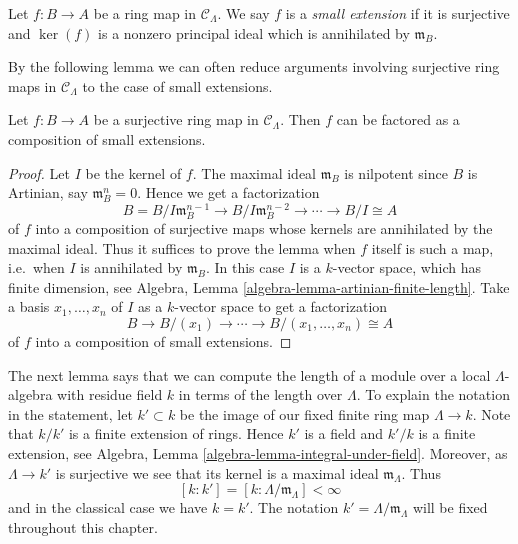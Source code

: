 \begin{definition}
\label{definition-small-extension}
Let $f: B \to A$ be a ring map in $\mathcal{C}_\Lambda$.  We say $f$
is a {\it small extension} if it is surjective and $\ker(f)$ is a nonzero
principal ideal which is annihilated by $\mathfrak{m}_B$.
\end{definition}

\noindent
By the following lemma we can often reduce arguments involving surjective ring
maps in $\mathcal{C}_\Lambda$ to the case of small extensions.

\begin{lemma}
\label{lemma-factor-small-extension}
Let $f: B \to A$ be a surjective ring map in $\mathcal{C}_\Lambda$.
Then $f$ can be factored as a composition of small extensions.
\end{lemma}

\begin{proof}
Let $I$ be the kernel of $f$.  The maximal ideal $\mathfrak{m}_B$ is
nilpotent since $B$ is Artinian, say $\mathfrak{m}_B^n = 0$. Hence we get a
factorization
$$
B = B/I\mathfrak{m}_B^{n-1} \to B/I\mathfrak{m}_B^{n-2} \to
\cdots \to B/I \cong A
$$
of $f$ into a composition of surjective maps whose kernels are annihilated by
the maximal ideal.  Thus it suffices to prove the lemma when $f$ itself is such
a map, i.e.\ when $I$ is annihilated by $\mathfrak{m}_B$. In this case
$I$ is a $k$-vector space, which has finite dimension, see
Algebra, Lemma \ref{algebra-lemma-artinian-finite-length}.
Take a basis $x_1, \dots, x_n$ of $I$ as a $k$-vector space to get a
factorization
$$
B \to B/(x_1) \to \cdots \to  B/(x_1, \dots, x_n) \cong  A
$$
of $f$ into a composition of small extensions.
\end{proof}

\noindent
The next lemma says that we can compute the length of a module over a local
$\Lambda$-algebra with residue field $k$ in terms of the length over
$\Lambda$. To explain the notation in the statement, let $k' \subset k$
be the image of our fixed finite ring map $\Lambda \to k$. Note
that $k/k'$ is a finite extension of rings. Hence $k'$ is a field
and $k'/k$ is a finite extension, see
Algebra, Lemma \ref{algebra-lemma-integral-under-field}.
Moreover, as $\Lambda \to k'$ is surjective we see that its kernel
is a maximal ideal $\mathfrak m_\Lambda$. Thus
\begin{equation}
\label{equation-k-prime}
[k : k'] = [k : \Lambda/\mathfrak m_\Lambda] < \infty
\end{equation}
and in the classical case we have $k = k'$. The notation
$k' = \Lambda/\mathfrak m_\Lambda$ will be fixed throughout this chapter.

